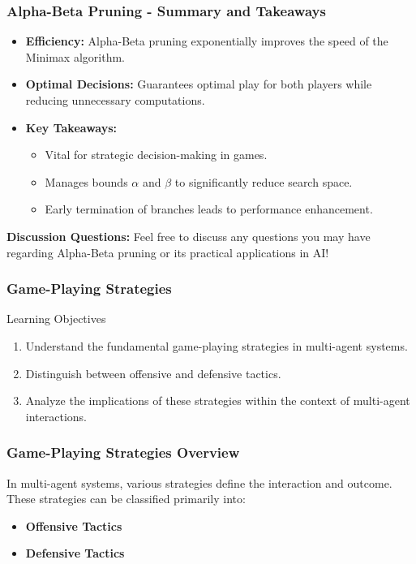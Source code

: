 \documentclass[aspectratio=169]{beamer}
\begin{document}
\begin{frame}[fragile]
    \frametitle{Alpha-Beta Pruning - Summary and Takeaways}
    \begin{itemize}
        \item \textbf{Efficiency:} Alpha-Beta pruning exponentially improves the speed of the Minimax algorithm.
        \item \textbf{Optimal Decisions:} Guarantees optimal play for both players while reducing unnecessary computations.
        \item \textbf{Key Takeaways:}
            \begin{itemize}
                \item Vital for strategic decision-making in games.
                \item Manages bounds $\alpha$ and $\beta$ to significantly reduce search space.
                \item Early termination of branches leads to performance enhancement.
            \end{itemize}
    \end{itemize}
    \textbf{Discussion Questions:} Feel free to discuss any questions you may have regarding Alpha-Beta pruning or its practical applications in AI!
\end{frame}

\begin{frame}[fragile]
    \frametitle{Game-Playing Strategies}
    \begin{block}{Learning Objectives}
        \begin{enumerate}
            \item Understand the fundamental game-playing strategies in multi-agent systems.
            \item Distinguish between offensive and defensive tactics.
            \item Analyze the implications of these strategies within the context of multi-agent interactions.
        \end{enumerate}
    \end{block}
\end{frame}

\begin{frame}[fragile]
    \frametitle{Game-Playing Strategies Overview}
    In multi-agent systems, various strategies define the interaction and outcome. These strategies can be classified primarily into:
    \begin{itemize}
        \item \textbf{Offensive Tactics}
        \item \textbf{Defensive Tactics}
    \end{itemize}
\end{frame}
\end{document}
